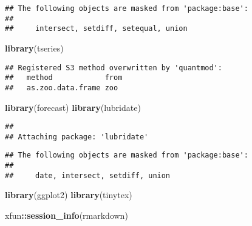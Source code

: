 \documentclass[
]{article}
\newenvironment{Shaded}{\begin{snugshade}}{\end{snugshade}}
\newcommand{\FunctionTok}[1]{\textcolor[rgb]{0.13,0.29,0.53}{\textbf{#1}}}
\newcommand{\NormalTok}[1]{#1}
\newcommand{\SpecialCharTok}[1]{\textcolor[rgb]{0.81,0.36,0.00}{\textbf{#1}}}
\newcommand{\StringTok}[1]{\textcolor[rgb]{0.31,0.60,0.02}{#1}}
\begin{document}
\begin{verbatim}
## The following objects are masked from 'package:base':
## 
##     intersect, setdiff, setequal, union
\end{verbatim}

\begin{Shaded}
\begin{Highlighting}[]
\FunctionTok{library}\NormalTok{(tseries)}
\end{Highlighting}
\end{Shaded}

\begin{verbatim}
## Registered S3 method overwritten by 'quantmod':
##   method            from
##   as.zoo.data.frame zoo
\end{verbatim}

\begin{Shaded}
\begin{Highlighting}[]
\FunctionTok{library}\NormalTok{(forecast) }
\FunctionTok{library}\NormalTok{(lubridate)}
\end{Highlighting}
\end{Shaded}

\begin{verbatim}
## 
## Attaching package: 'lubridate'
\end{verbatim}

\begin{verbatim}
## The following objects are masked from 'package:base':
## 
##     date, intersect, setdiff, union
\end{verbatim}

\begin{Shaded}
\begin{Highlighting}[]
\FunctionTok{library}\NormalTok{(ggplot2)}
\FunctionTok{library}\NormalTok{(tinytex)}
\end{Highlighting}
\end{Shaded}

\begin{Shaded}
\begin{Highlighting}[]
\NormalTok{xfun}\SpecialCharTok{::}\FunctionTok{session\_info}\NormalTok{(}\StringTok{\textquotesingle{}rmarkdown\textquotesingle{}}\NormalTok{)}
\end{Highlighting}
\end{Shaded}
\end{document}
